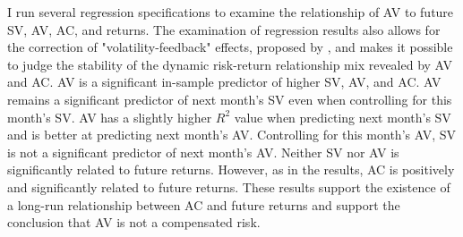 I run several regression specifications to examine the relationship of AV to future SV, AV, AC, and returns. The examination of regression results also allows for the correction of "volatility-feedback" effects, proposed by \citet{campbell_no_1992}, and makes it possible to judge the stability of the dynamic risk-return relationship mix revealed by AV and AC. AV is a significant in-sample predictor of higher SV, AV, and AC.  %
AV remains a significant predictor of next month’s SV even when controlling for this month's SV. AV has a slightly higher $R^{2}$ value when predicting next month's SV and is better at predicting next month's AV. Controlling for this month's AV, SV is not a significant predictor of next month's AV. Neither SV nor AV is significantly related to future returns. However, as in the \citet{pollet_average_2010} results, AC is positively and significantly related to future returns. %
These results support the existence of a long-run relationship between AC and future returns and support the conclusion that AV is not a compensated risk. 

